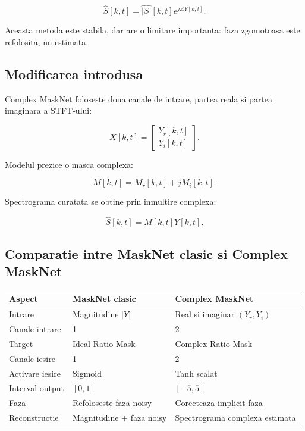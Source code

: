 \documentclass[12pt,a4paper]{article}
\begin{document}
\begin{equation}
    \hat{S}[k,t] = \hat{|S|}[k,t] e^{j \angle Y[k,t]}.
\end{equation}

Aceasta metoda este stabila, dar are o limitare importanta: faza zgomotoasa este
refolosita, nu estimata.

\subsection{Modificarea introdusa}

Complex MaskNet foloseste doua canale de intrare, partea reala si partea imaginara
a STFT-ului:

\begin{equation}
    X[k,t] =
    \begin{bmatrix}
        Y_r[k,t] \\
        Y_i[k,t]
    \end{bmatrix}.
\end{equation}

Modelul prezice o masca complexa:

\begin{equation}
    M[k,t] = M_r[k,t] + jM_i[k,t].
\end{equation}

Spectrograma curatata se obtine prin inmultire complexa:

\begin{equation}
    \hat{S}[k,t] = M[k,t]Y[k,t].
\end{equation}

\subsection{Comparatie intre MaskNet clasic si Complex MaskNet}

\begin{center}
\begin{tabular}{lll}
\toprule
\textbf{Aspect} & \textbf{MaskNet clasic} & \textbf{Complex MaskNet} \\
\midrule
Intrare & Magnitudine $|Y|$ & Real si imaginar $(Y_r,Y_i)$ \\
Canale intrare & 1 & 2 \\
Target & Ideal Ratio Mask & Complex Ratio Mask \\
Canale iesire & 1 & 2 \\
Activare iesire & Sigmoid & Tanh scalat \\
Interval output & $[0,1]$ & $[-5,5]$ \\
Faza & Refoloseste faza noisy & Corecteaza implicit faza \\
Reconstructie & Magnitudine + faza noisy & Spectrograma complexa estimata \\
\bottomrule
\end{tabular}
\end{center}
\end{document}
